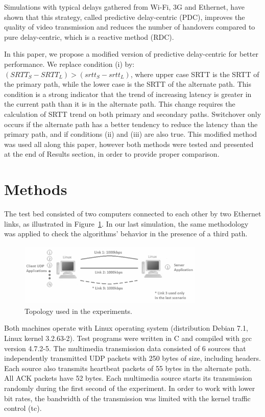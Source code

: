 \documentclass[letterpaper,10pt,oneside,conference,final]{sbrt2015}
\begin{document}
Simulations with typical delays gathered from Wi-Fi, 3G and Ethernet, have shown that this strategy, called predictive delay-centric (PDC), improves the quality of video transmission and reduces the number of handovers compared to pure delay-centric, which is a reactive method (RDC).

In this paper, we propose a modified version of predictive delay-centric for better performance. We replace condition (i) by:
${(SRTT_S - SRTT_L) > (srtt_S - srtt_L)}$, where upper case SRTT is the SRTT of the primary path, while the lower case is the SRTT of the alternate path. This condition is a strong indicator that the trend of increasing latency is greater in the current path than it is in the alternate path. This change requires the calculation of SRTT trend on both primary and secondary paths. Switchover only occurs if the alternate path has a better tendency to reduce the latency than the primary path, and if conditions (ii) and (iii) are also true. This modified method was used all along this paper, however both methods were tested and presented at the end of Results section, in order to provide proper comparison.

\section{Methods}

The test bed consisted of two computers connected to each other by two Ethernet links, as illustrated in Figure~\ref{topology}. In our last simulation, the same methodology was applied to check the algorithms' behavior in the presence of a third path.

\begin{figure}[ht!]
\centering
\includegraphics[width=8.8cm,height=3cm]{figura1}
\caption{Topology used in the experiments.}
\label{topology}
\end{figure}

Both machines operate with Linux operating system (distribution Debian 7.1, Linux kernel 3.2.63-2). Test programs were written in C and compiled with gcc version 4.7.2-5. The multimedia transmission data consisted of 6 sources that independently transmitted UDP packets with 250 bytes of size, including headers. Each source also transmits heartbeat packets of 55 bytes in the alternate path. All ACK packets have 52 bytes. Each multimedia source starts its transmission randomly during the first second of the experiment. In order to work with lower bit rates, the bandwidth of the transmission was limited with the kernel traffic control (tc). 
\end{document}
